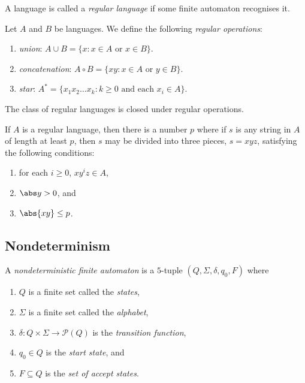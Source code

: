 \documentclass{article}
\begin{document}
\begin{definition}[Sipser p. 40]
    A language is called a \emph{regular language} if some finite automaton recognises it.
\end{definition}

\begin{definition}[Sipser p. 44]
    Let $A$ and $B$ be languages. We define the following \emph{regular operations}:
    \begin{enumerate}
        \item \emph{union}: $A\cup B=\{x : x \in A \text{ or } x \in B\}$.
        \item \emph{concatenation}: $A\circ B=\{xy : x \in A \text{ or } y \in B\}$.
        \item \emph{star}: $A^* = \{x_1x_2\dots x_k:k\geq 0 \text{ and each }x_i\in A\}$.
    \end{enumerate}
\end{definition}

\begin{theorem}[Sipser p. 45, 60, 62]
    The class of regular languages is closed under regular operations.
\end{theorem}

\begin{theorem}
    If $A$ is a regular language, then there is a number $p$ where if $s$
    is any string in $A$ of length at least $p$, then $s$ may be divided 
    into three pieces, $s=xyz$, satisfying the following conditions:
    \begin{enumerate}
        \item for each $i\geq 0$, $xy^iz\in A$,
        \item $\abs y > 0$, and 
        \item $\abs{xy} \leq p$.
    \end{enumerate} 
\end{theorem}

\subsection{Nondeterminism}

\begin{definition}
    A \emph{nondeterministic finite automaton} is a $5$-tuple $(Q,\Sigma,\delta,q_0,F)$ where 
    \begin{enumerate}
        \item $Q$ is a finite set called the \emph{states},
        \item $\Sigma$ is a finite set called the \emph{alphabet},
        \item $\delta:Q\times\Sigma\to\mathcal{P}(Q)$ is the \emph{transition function},
        \item $q_0\in Q$ is the \emph{start state}, and 
        \item $F\subseteq Q$ is the \emph{set of accept states}.
    \end{enumerate} 
\end{definition}
\end{document}
